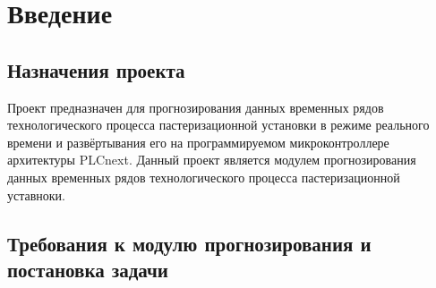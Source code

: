 \sectionbreak \section{ \standartTitleFont
  Введение
}

\subsection{ \standartTitleFont
  Назначения проекта
}

{\standartFont

  \par Проект предназначен для прогнозирования данных временных рядов технологического процесса пастеризационной установки в режиме реального времени и развёртывания его на программируемом микроконтроллере архитектуры PLCnext. Данный проект является модулем прогнозирования данных временных рядов технологического процесса пастеризационной уставноки. 

  \par 
}

\subsection{ \standartTitleFont
  Требования к модулю прогнозирования и постановка задачи 
}

